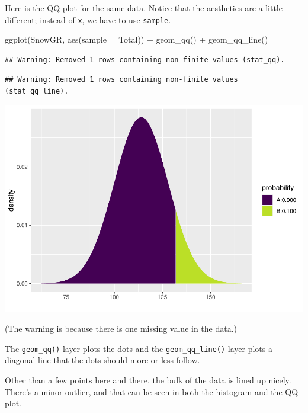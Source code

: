 \documentclass[
]{book}
\newenvironment{Shaded}{\begin{snugshade}}{\end{snugshade}}
\newcommand{\AttributeTok}[1]{\textcolor[rgb]{0.77,0.63,0.00}{#1}}
\newcommand{\FunctionTok}[1]{\textcolor[rgb]{0.00,0.00,0.00}{#1}}
\newcommand{\NormalTok}[1]{#1}
\newcommand{\SpecialCharTok}[1]{\textcolor[rgb]{0.00,0.00,0.00}{#1}}
\begin{document}
Here is the QQ plot for the same data. Notice that the aesthetics are a little different; instead of \texttt{x}, we have to use \texttt{sample}.

\begin{Shaded}
\begin{Highlighting}[]
\FunctionTok{ggplot}\NormalTok{(SnowGR, }\FunctionTok{aes}\NormalTok{(}\AttributeTok{sample =}\NormalTok{ Total)) }\SpecialCharTok{+}
    \FunctionTok{geom\_qq}\NormalTok{() }\SpecialCharTok{+}
    \FunctionTok{geom\_qq\_line}\NormalTok{()}
\end{Highlighting}
\end{Shaded}

\begin{verbatim}
## Warning: Removed 1 rows containing non-finite values (stat_qq).
\end{verbatim}

\begin{verbatim}
## Warning: Removed 1 rows containing non-finite values (stat_qq_line).
\end{verbatim}

\includegraphics{intro_stats_files/figure-latex/unnamed-chunk-358-1.pdf}

(The warning is because there is one missing value in the data.)

The \texttt{geom\_qq()} layer plots the dots and the \texttt{geom\_qq\_line()} layer plots a diagonal line that the dots should more or less follow.

Other than a few points here and there, the bulk of the data is lined up nicely. There's a minor outlier, and that can be seen in both the histogram and the QQ plot.
\end{document}
